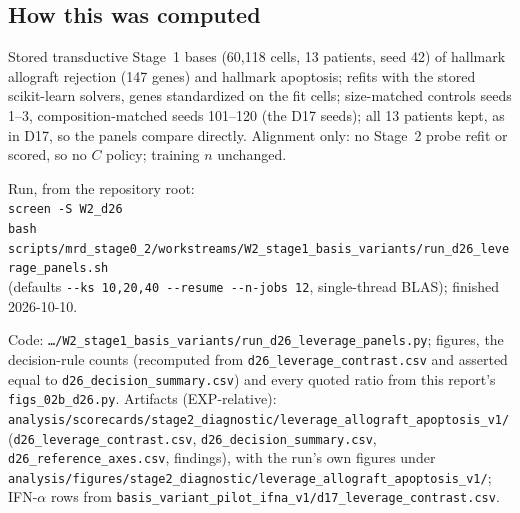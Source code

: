 \subsection*{How this was computed}
{\small\raggedright
Stored transductive Stage~1 bases (60,118 cells, 13 patients, seed 42) of hallmark allograft rejection (147 genes) and hallmark apoptosis; refits with the stored scikit-learn solvers, genes standardized on the fit cells; size-matched controls seeds 1--3, composition-matched seeds 101--120 (the D17 seeds); all 13 patients kept, as in D17, so the panels compare directly. Alignment only: no Stage~2 probe refit or scored, so no $C$ policy; training $n$ unchanged. \par\smallskip Run, from the repository root:\\
{\footnotesize\hspace*{1em}\texttt{screen -S W2\_d26}\\
\hspace*{1em}\mbox{\texttt{bash scripts/mrd\_stage0\_2/workstreams/W2\_stage1\_basis\_variants/run\_d26\_leverage\_panels.sh}}\\}
(defaults \texttt{\mbox{-{}-ks 10,20,40} \mbox{-{}-resume} \mbox{-{}-n-jobs 12}}, single-thread BLAS); finished 2026-10-10.\par\smallskip Code: \texttt{\ldots/\allowbreak W2\_stage1\_basis\_variants/\allowbreak run\_d26\_leverage\_panels.py}; figures, the decision-rule counts (recomputed from \texttt{d26\_leverage\_contrast.csv} and asserted equal to \texttt{d26\_decision\_summary.csv}) and every quoted ratio from this report's \texttt{figs\_02b\_d26.py}. Artifacts (EXP-relative): \texttt{analysis/\allowbreak scorecards/\allowbreak stage2\_diagnostic/\allowbreak leverage\_allograft\_apoptosis\_v1/} (\texttt{d26\_leverage\_contrast.csv}, \texttt{d26\_decision\_summary.csv}, \texttt{d26\_reference\_axes.csv}, findings), with the run's own figures under \texttt{analysis/\allowbreak figures/\allowbreak stage2\_diagnostic/\allowbreak leverage\_allograft\_apoptosis\_v1/}; IFN-$\alpha$ rows from \texttt{basis\_variant\_pilot\_ifna\_v1/\allowbreak d17\_leverage\_contrast.csv}. \par}
